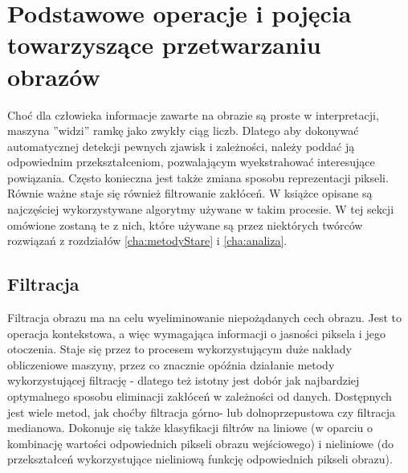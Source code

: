 \section{Podstawowe operacje i pojęcia towarzyszące przetwarzaniu obrazów}
Choć dla człowieka informacje zawarte na obrazie są proste w interpretacji, maszyna ''widzi'' ramkę jako zwykły ciąg liczb. Dlatego aby dokonywać automatycznej detekcji pewnych zjawisk i zależności, należy poddać ją odpowiednim przekształceniom, pozwalającym wyekstrahować interesujące powiązania. Często konieczna jest także zmiana sposobu reprezentacji pikseli. Równie ważne staje się również filtrowanie zakłóceń. W książce \cite{i1823330731} opisane są najczęściej wykorzystywane algorytmy używane w takim procesie. W tej sekcji omówione zostaną te z nich, które używane są przez niektórych twórców rozwiązań z rozdziałów \ref{cha:metodyStare} i \ref{cha:analiza}. 
\subsection{Filtracja}
Filtracja obrazu ma na celu wyeliminowanie niepożądanych cech obrazu. Jest to operacja kontekstowa, a więc wymagająca informacji o jasności piksela i jego otoczenia. Staje się przez to procesem wykorzystującym duże nakłady obliczeniowe maszyny, przez co znacznie opóźnia działanie metody wykorzystującej filtrację - dlatego też istotny jest dobór jak najbardziej optymalnego sposobu eliminacji zakłóceń w zależności od danych. Dostępnych jest wiele metod, jak choćby filtracja górno- lub dolnoprzepustowa czy filtracja medianowa. Dokonuje się także klasyfikacji filtrów na liniowe (w oparciu o kombinację wartości odpowiednich pikseli obrazu wejściowego) i nieliniowe (do przekształceń wykorzystujące nieliniową funkcję odpowiednich pikseli obrazu). 
